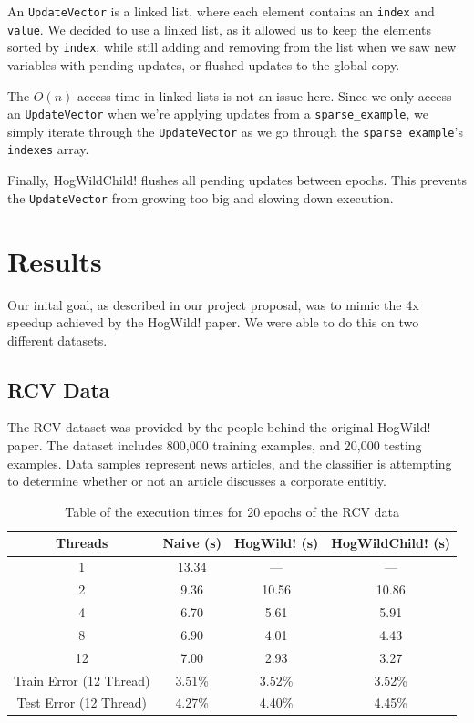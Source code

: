 \documentclass{article}
\begin{document}
An \texttt{UpdateVector} is a linked list, where each element contains
an \texttt{index} and \texttt{value}.
We decided to use a linked list, as it allowed us to keep the elements
sorted by \texttt{index}, while still adding and removing from the list
when we saw new variables with pending updates, or flushed updates to the
global copy.

The $O(n)$ access time in linked lists is not an issue here.
Since we only access an \texttt{UpdateVector} when we're applying updates
from a \texttt{sparse\_example},
we simply iterate through the \texttt{UpdateVector} as we go through the
\texttt{sparse\_example}'s \texttt{indexes} array.

Finally, HogWildChild! flushes all pending updates between epochs.
This prevents the \texttt{UpdateVector} from growing too big and slowing
down execution.

\section{Results}

Our inital goal, as described in our project proposal, was to mimic the
4x speedup achieved by the HogWild! paper.
We were able to do this on two different datasets.

\subsection{RCV Data}

The RCV dataset was provided by the people behind the original HogWild!
paper.
The dataset includes 800,000 training examples, and 20,000 testing
examples.
Data samples represent news articles, and the classifier is attempting
to determine whether or not an article discusses a corporate entitiy.

\begin{table}[h!]
\centering
\begin{tabular}{| c | c | c | c |}
\hline
Threads & Naive	(s)	& HogWild! (s)	& HogWildChild! (s) \\
\hline
1	& 13.34		& --- 		& ---	\\
2	& 9.36		& 10.56		& 10.86	\\
4	& 6.70		& 5.61		& 5.91	\\
8	& 6.90		& 4.01		& 4.43	\\
12	& 7.00		& 2.93		& 3.27	\\
\hline
Train Error (12 Thread) & 3.51\%	& 3.52\%	& 3.52\% \\
Test Error  (12 Thread)& 4.27\%	& 4.40\%	& 4.45\% \\
\hline
\end{tabular}
\label{tab-rcv}
\caption{Table of the execution times for 20 epochs of the RCV data}
\end{table}
\end{document}
